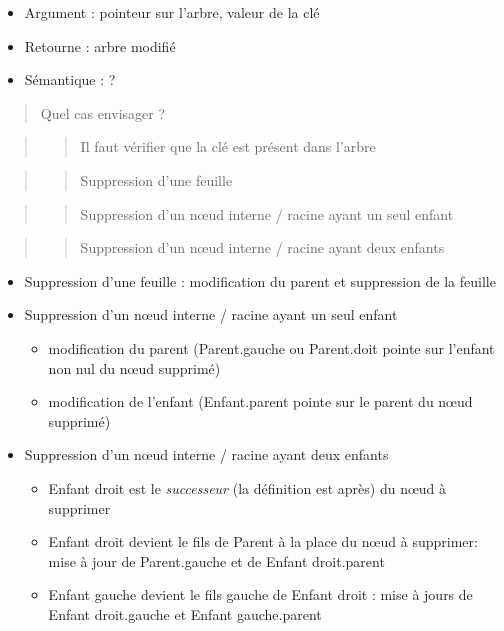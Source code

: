 \begin{itemize}
\tightlist
\item
  Argument : pointeur sur l'arbre, valeur de la clé
\item
  Retourne : arbre modifié
\item
  Sémantique : ?
\end{itemize}

\begin{quote}
Quel cas envisager ?
\end{quote}

\begin{quote}
\begin{quote}
Il faut vérifier que la clé est présent dans l'arbre
\end{quote}
\end{quote}

\begin{quote}
\begin{quote}
Suppression d'une feuille
\end{quote}
\end{quote}

\begin{quote}
\begin{quote}
Suppression d'un nœud interne / racine ayant un seul enfant
\end{quote}
\end{quote}

\begin{quote}
\begin{quote}
Suppression d'un nœud interne / racine ayant deux enfants
\end{quote}
\end{quote}

\begin{itemize}
\item
  Suppression d'une feuille : modification du parent et suppression de
  la feuille
\item
  Suppression d'un nœud interne / racine ayant un seul enfant

  \begin{itemize}
  \tightlist
  \item
    modification du parent (Parent.gauche ou Parent.doit pointe sur
    l'enfant non nul du nœud supprimé)
  \item
    modification de l'enfant (Enfant.parent pointe sur le parent du nœud
    supprimé)
  \end{itemize}
\item
  Suppression d'un nœud interne / racine ayant deux enfants

  \begin{itemize}
  \tightlist
  \item
    Enfant droit est le \emph{successeur} (la définition est après) du
    nœud à supprimer
  \item
    Enfant droit devient le fils de Parent à la place du nœud à
    supprimer: mise à jour de Parent.gauche et de Enfant droit.parent
  \item
    Enfant gauche devient le fils gauche de Enfant droit : mise à jours
    de Enfant droit.gauche et Enfant gauche.parent
  \end{itemize}
\end{itemize}

